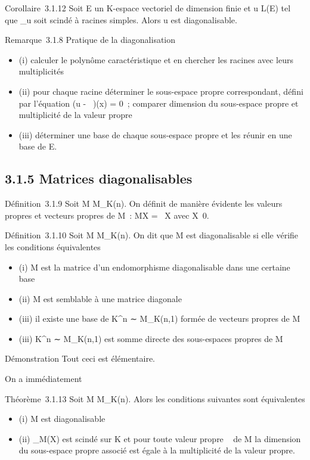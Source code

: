 \documentclass[]{article}
\begin{document}
Corollaire~3.1.12 Soit E un K-espace vectoriel de dimension finie et u \in
L(E) tel que \chi_u soit scindé à racines simples. Alors u est
diagonalisable.

Remarque~3.1.8 Pratique de la diagonalisation

\begin{itemize}
\itemsep1pt\parskip0pt
\item
  (i) calculer le polynôme caractéristique et en chercher les racines
  avec leurs multiplicités
\item
  (ii) pour chaque racine déterminer le sous-espace propre
  correspondant, défini par l'équation (u -
  \lambda~\mathrmId)(x) = 0~; comparer dimension du
  sous-espace propre et multiplicité de la valeur propre
\item
  (iii) déterminer une base de chaque sous-espace propre et les réunir
  en une base de E.
\end{itemize}

\subsection{3.1.5 Matrices diagonalisables}

Définition~3.1.9 Soit M \in M_K(n). On définit de manière
évidente les valeurs propres et vecteurs propres de M~: MX = \lambda~X avec
X\neq~0.

Définition~3.1.10 Soit M \in M_K(n). On dit que M est
diagonalisable si elle vérifie les conditions équivalentes

\begin{itemize}
\itemsep1pt\parskip0pt
\item
  (i) M est la matrice d'un endomorphisme diagonalisable dans une
  certaine base
\item
  (ii) M est semblable à une matrice diagonale
\item
  (iii) il existe une base de K^n ∼ M_K(n,1) formée
  de vecteurs propres de M
\item
  (iii) K^n ∼ M_K(n,1) est somme directe des
  sous-espaces propres de M
\end{itemize}

Démonstration Tout ceci est élémentaire.

On a immédiatement

Théorème~3.1.13 Soit M \in M_K(n). Alors les conditions suivantes
sont équivalentes

\begin{itemize}
\itemsep1pt\parskip0pt
\item
  (i) M est diagonalisable
\item
  (ii) \chi_M(X) est scindé sur K et pour toute valeur propre \lambda~ de
  M la dimension du sous-espace propre associé est égale à la
  multiplicité de la valeur propre.
\end{itemize}
\end{document}
